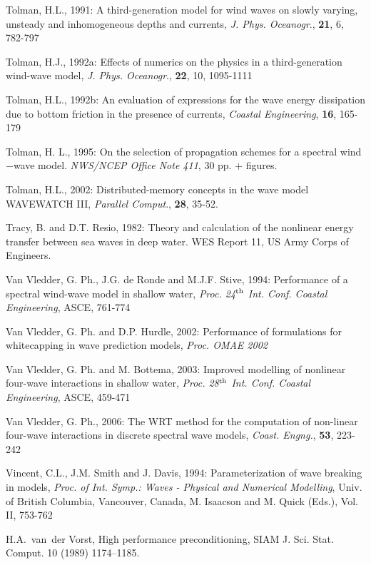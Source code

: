 \documentclass[12pt]{book}
\begin{document}
\begin{thebibliography}{10}
Tolman, H.L., 1991: A third-generation model for wind waves on slowly varying, unsteady and
inhomogeneous depths and currents, {\it J. Phys. Oceanogr}., {\bf 21}, 6, 782-797

Tolman, H.J., 1992a: Effects of numerics on the physics in a third-generation wind-wave model, {\it J. Phys.
Oceanogr}., {\bf 22}, 10, 1095-1111

Tolman, H.L., 1992b: An evaluation of expressions for the wave energy dissipation due to bottom friction
in the presence of currents, {\it Coastal Engineering}, {\bf 16}, 165-179

Tolman, H. L., 1995: On the selection of propagation schemes for a spectral wind$-$wave model.
{\it NWS/NCEP Office Note 411}, 30 pp. + figures.

Tolman, H.L., 2002: Distributed-memory concepts in the wave model {WAVEWATCH III},
{\it Parallel Comput}., {\bf 28}, 35-52.

Tracy, B. and D.T. Resio, 1982: Theory and calculation of the nonlinear energy transfer between
sea waves in deep water. WES Report 11, US Army Corps of Engineers.

Van Vledder, G. Ph., J.G. de Ronde and M.J.F. Stive, 1994: Performance of a spectral wind-wave model
in shallow water, {\it Proc. 24$^{{\rm th}}$ Int. Conf. Coastal Engineering}, ASCE, 761-774

Van Vledder, G. Ph. and D.P. Hurdle, 2002: Performance of formulations for whitecapping in wave
prediction models, {\it Proc. OMAE 2002}

Van Vledder, G. Ph. and M. Bottema, 2003: Improved modelling of nonlinear four-wave interactions
in shallow water, {\it Proc. 28$^{{\rm th}}$ Int. Conf. Coastal Engineering}, ASCE, 459-471

Van Vledder, G. Ph., 2006: The {WRT} method for the computation of non-linear four-wave interactions in
discrete spectral wave models, {\it Coast. Engng.}, {\bf 53}, 223-242

Vincent, C.L., J.M. Smith and J. Davis, 1994: Parameterization of wave breaking in  models, {\it Proc. of Int.
Symp.: Waves - Physical and Numerical Modelling}, Univ. of British Columbia, Vancouver,
Canada, M. Isaacson and M. Quick (Eds.), Vol. II, 753-762

H.A.~van~der Vorst, High performance preconditioning, SIAM J. Sci. Stat. Comput.
  10 (1989) 1174--1185.


\end{thebibliography}
\end{document}
